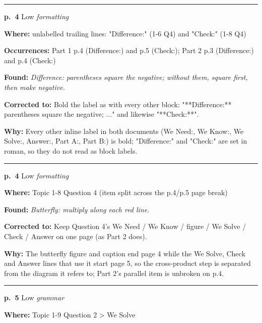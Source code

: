 \documentclass[11pt]{article}
\newcommand{\sevlow}[1]{\textcolor{black!55}{#1}}
\begin{document}
\noindent\rule{\textwidth}{0.4pt}\par\nobreak\vspace{2pt}
\noindent\textbf{p.~4} \quad \sevlow{Low} \quad \textit{formatting}\par
\noindent\textbf{Where: }unlabelled trailing lines: "Difference:" (1-6 Q4) and "Check:" (1-8 Q4)\par
\noindent\textbf{Occurrences: }Part 1 p.4 (Difference:) and p.5 (Check:); Part 2 p.3 (Difference:) and p.4 (Check:)\par
\noindent\textbf{Found: }\textit{Difference: parentheses square the negative; without them, square first, then make negative.}\par
\noindent\textbf{Corrected to: }Bold the label as with every other block: "**Difference:** parentheses square the negative; ..." and likewise "**Check:**".\par
\noindent\textbf{Why: }Every other inline label in both documents (We Need:, We Know:, We Solve:, Answer:, Part A:, Part B:) is bold; "Difference:" and "Check:" are set in roman, so they do not read as block labels.\par\vspace{4pt}
\noindent\rule{\textwidth}{0.4pt}\par\nobreak\vspace{2pt}
\noindent\textbf{p.~4} \quad \sevlow{Low} \quad \textit{formatting}\par
\noindent\textbf{Where: }Topic 1-8 Question 4 (item split across the p.4/p.5 page break)\par
\noindent\textbf{Found: }\textit{Butterfly: multiply along each red line.}\par
\noindent\textbf{Corrected to: }Keep Question 4's We Need / We Know / figure / We Solve / Check / Answer on one page (as Part 2 does).\par
\noindent\textbf{Why: }The butterfly figure and caption end page 4 while the We Solve, Check and Answer lines that use it start page 5, so the cross-product step is separated from the diagram it refers to; Part 2's parallel item is unbroken on p.4.\par\vspace{4pt}
\noindent\rule{\textwidth}{0.4pt}\par\nobreak\vspace{2pt}
\noindent\textbf{p.~5} \quad \sevlow{Low} \quad \textit{grammar}\par
\noindent\textbf{Where: }Topic 1-9 Question 2 > We Solve\par
\end{document}
